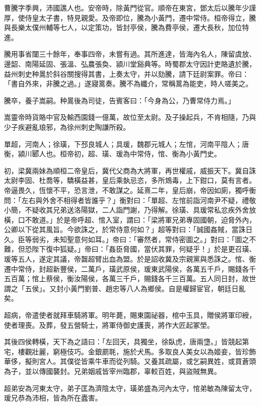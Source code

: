 \begin{pinyinscope}
曹騰字季興，沛國譙人也。安帝時，除黃門從官。順帝在東宮，鄧太后以騰年少謹厚，使侍皇太子書，特見親愛。及帝即位，騰為小黃門，遷中常侍。桓帝得立，騰與長樂太僕州輔等七人，以定策功，皆封亭侯，騰為費亭侯，遷大長秋，加位特進。

騰用事省闥三十餘年，奉事四帝，未嘗有過。其所進達，皆海內名人，陳留虞放、邊韶、南陽延固、張溫、弘農張奐、潁川堂谿典等。時蜀郡太守因計吏賂遺於騰，益州刺史种暠於斜谷關搜得其書，上奏太守，并以劾騰，請下廷尉案罪。帝曰：「書自外來，非騰之過。」遂寢暠奏。騰不為纖介，常稱暠為能吏，時人嗟美之。

騰卒，養子嵩嗣。种暠後為司徒，告賓客曰：「今身為公，乃曹常侍力焉。」

嵩靈帝時貨賂中官及輸西園錢一億萬，故位至太尉。及子操起兵，不肯相隨，乃與少子疾避亂琅邪，為徐州刺史陶謙所殺。

單超，河南人；徐璜，下邳良城人；具瑗，魏郡元城人；左悺，河南平陰人；唐衡，潁川郾人也。桓帝初，超、璜、瑗為中常侍，悺、衡為小黃門史。

初，梁冀兩妹為順桓二帝皇后，冀代父商為大將軍，再世權戚，威振天下。冀自誅太尉李固、杜喬等，驕橫益甚，皇后乘埶忌恣，多所鴆毒，上下鉗口，莫有言者。帝逼畏久，恆懷不平，恐言泄，不敢謀之。延熹二年，皇后崩，帝因如廁，獨呼衡問：「左右與外舍不相得者皆誰乎？」衡對曰：「單超、左悺前詣河南尹不疑，禮敬小簡，不疑收其兄弟送洛陽獄，二人詣門謝，乃得解。徐璜、具瑗常私忿疾外舍放橫，口不敢道。」於是帝呼超、悺入室，謂曰：「梁將軍兄弟專固國朝，迫脅外內，公卿以下從其風旨。今欲誅之，於常侍意何如？」超等對曰：「誠國姦賊，當誅日久。臣等弱劣，未知聖意何如耳。」帝曰：「審然者，常侍密圖之。」對曰：「圖之不難，但恐陛下復中狐疑。」帝曰：「姦臣脅國，當伏其罪，何疑乎！」於是更召璜、瑗等五人，遂定其議，帝齧超臂出血為盟。於是詔收冀及宗親黨與悉誅之。悺、衡遷中常侍，封超新豐侯，二萬戶，璜武原侯，瑗東武陽侯，各萬五千戶，賜錢各千五百萬；悺上蔡侯，衡汝陽侯，各萬三千戶，賜錢各千三百萬。五人同日封，故世謂之「五侯」。又封小黃門劉普、趙忠等八人為鄉侯。自是權歸宦官，朝廷日亂矣。

超病，帝遣使者就拜車騎將軍。明年薨，賜東園祕器，棺中玉具，贈侯將軍印綬，使者理喪。及葬，發五營騎士，將軍侍御史護喪，將作大匠起冢塋。

其後四侯轉橫，天下為之語曰：「左回天，具獨坐，徐臥虎，唐兩墯。」皆競起第宅，樓觀壯麗，窮極伎巧。金銀罽毦，施於犬馬。多取良人美女以為姬妾，皆珍飾華侈，擬則宮人。其僕從皆乘牛車而從列騎。又養其疏屬，或乞嗣異姓，或買蒼頭為子，並以傳國襲封。兄弟姻戚皆宰州臨郡，辜較百姓，與盜賊無異。

超弟安為河東太守，弟子匡為濟陰太守，璜弟盛為河內太守，悺弟敏為陳留太守，瑗兄恭為沛相，皆為所在蠹害。


\end{pinyinscope}
